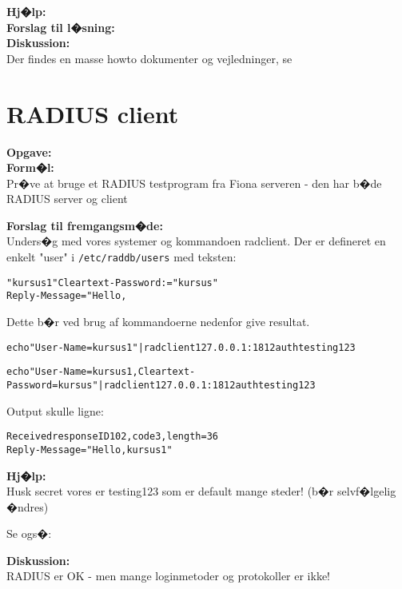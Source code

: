 \documentclass[a4paper,11pt,notitlepage]{oevelser}
\begin{document}
{\bfseries Hj�lp:}\\

{\bfseries Forslag til l�sning:}\\

{\bfseries Diskussion:}\\
Der findes en masse howto dokumenter og vejledninger, se 


\chapter{RADIUS client}
\label{ex:radius-client}


{\bfseries Opgave:}\\

{\bfseries Form�l:}\\
Pr�ve at bruge et RADIUS testprogram fra Fiona serveren - den har b�de RADIUS server og client

{\bfseries Forslag til fremgangsm�de:}\\
Unders�g med  vores systemer og kommandoen radclient. Der er defineret en enkelt "user" i \verb+/etc/raddb/users+
med teksten:
\begin{alltt}
"kursus1"       Cleartext-Password := "kursus"
                Reply-Message = "Hello, %{User-Name}"
\end{alltt}

Dette b�r ved brug af kommandoerne nedenfor give resultat.

\begin{alltt}\footnotesize
echo "User-Name = kursus1" | radclient 127.0.0.1:1812 auth testing123

echo "User-Name=kursus1,Cleartext-Password=kursus " | radclient 127.0.0.1:1812 auth testing123
\end{alltt}

Output skulle ligne:
\begin{alltt}
	Received response ID 102, code 3, length = 36
        Reply-Message = "Hello, kursus1"
\end{alltt}

{\bfseries Hj�lp:}\\
Husk secret vores er testing123 som er default mange steder! (b�r selvf�lgelig �ndres)

Se ogs�: 

{\bfseries Diskussion:}\\
RADIUS er OK - men mange loginmetoder og protokoller er ikke!
\end{document}
